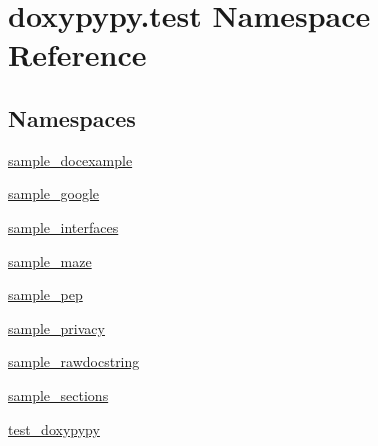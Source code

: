 \hypertarget{namespacedoxypypy_1_1test}{\section{doxypypy.\-test Namespace Reference}
\label{namespacedoxypypy_1_1test}
}
\subsection*{Namespaces}
\begin{DoxyCompactItemize}
\item 
\hyperlink{namespacedoxypypy_1_1test_1_1sample__docexample}{sample\-\_\-docexample}
\item 
\hyperlink{namespacedoxypypy_1_1test_1_1sample__google}{sample\-\_\-google}
\item 
\hyperlink{namespacedoxypypy_1_1test_1_1sample__interfaces}{sample\-\_\-interfaces}
\item 
\hyperlink{namespacedoxypypy_1_1test_1_1sample__maze}{sample\-\_\-maze}
\item 
\hyperlink{namespacedoxypypy_1_1test_1_1sample__pep}{sample\-\_\-pep}
\item 
\hyperlink{namespacedoxypypy_1_1test_1_1sample__privacy}{sample\-\_\-privacy}
\item 
\hyperlink{namespacedoxypypy_1_1test_1_1sample__rawdocstring}{sample\-\_\-rawdocstring}
\item 
\hyperlink{namespacedoxypypy_1_1test_1_1sample__sections}{sample\-\_\-sections}
\item 
\hyperlink{namespacedoxypypy_1_1test_1_1test__doxypypy}{test\-\_\-doxypypy}
\end{DoxyCompactItemize}
